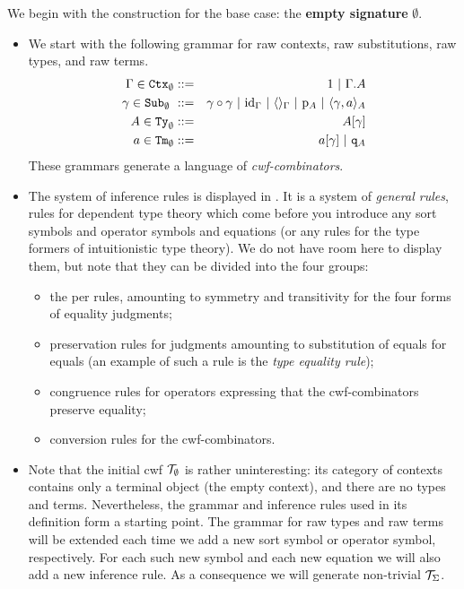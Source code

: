 \documentclass{lmcs}
\def\id{\mathrm{id}}
\begin{document}
We begin with the construction for the base case: the {\bf empty signature} $\emptyset$. 
\begin{itemize}
\item 
We start with the following grammar for raw contexts, raw substitutions, raw types, and raw terms.
\begin{eqnarray*}
\Gamma \in \RawCtx_\emptyset &::=& 1  \ |\ \Gamma\cext A\\
\gamma \in \RawSub_\emptyset  \ &::=& \gamma \circ \gamma \ |\ \id_\Gamma \ |\ \langle\rangle_\Gamma \ |\ \p_{A} \ |\ \langle \gamma, a \rangle_A\\
A \in \RawTy_\emptyset  &::=& A[\gamma]\\
a \in \RawTm_\emptyset  &::=& a[\gamma] \ |\ \qI_A
\end{eqnarray*}
These grammars generate a language of {\em cwf-combinators}.
\item
The system of inference rules is displayed in \cite{castellan:tlca2015,castellan:lmcs}. It is a system of {\em general rules}, rules for dependent type theory which come before you introduce any sort symbols and operator symbols and equations (or any rules for the type formers of intuitionistic type theory). We do not have room here to display them, but note that they can be divided into the four groups: 
\begin{itemize}
\item the per rules, amounting to symmetry and transitivity for the four forms of equality judgments;
\item preservation rules for judgments amounting to substitution of equals for equals (an example of such a rule is the {\em type equality rule});
\item congruence rules for operators expressing that the cwf-combinators preserve equality;
\item conversion rules for the cwf-combinators.
\end{itemize}
\item
Note that the initial cwf ${\mathcal T}_\emptyset$ is rather uninteresting: its category of contexts contains only a terminal object (the empty context), and there are no types and terms. Nevertheless, the grammar and inference rules used in its definition form a starting point. The grammar for raw types and raw terms will be extended each time we add a new sort symbol or operator symbol, respectively. For each such new symbol and each new equation we will also add a new inference rule. As a consequence we will generate non-trivial ${\mathcal T}_\Sigma$.
\end{itemize}
\end{document}
